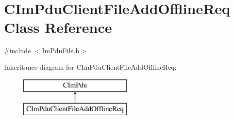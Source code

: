 \hypertarget{class_c_im_pdu_client_file_add_offline_req}{}\section{C\+Im\+Pdu\+Client\+File\+Add\+Offline\+Req Class Reference}
\label{class_c_im_pdu_client_file_add_offline_req}


{\ttfamily \#include $<$Im\+Pdu\+File.\+h$>$}

Inheritance diagram for C\+Im\+Pdu\+Client\+File\+Add\+Offline\+Req\+:\begin{figure}[H]
\begin{center}
\leavevmode
\includegraphics[height=2.000000cm]{class_c_im_pdu_client_file_add_offline_req}
\end{center}
\end{figure}
